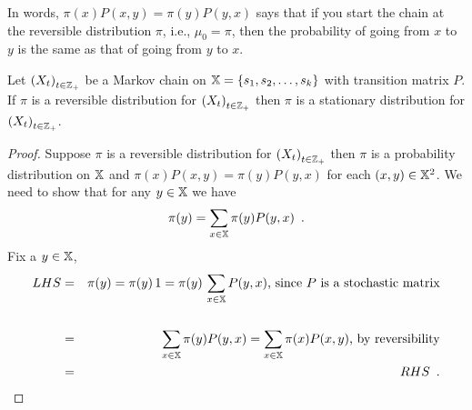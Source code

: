 {In words, $\pi(x) P(x,y) = \pi(y) P(y,x)$ says that if you start the chain at the reversible distribution $\pi$, i.e., $\mu_0 = \pi$, then the probability of going from $x$ to $y$ is the same as that of going from $y$ to $x$.

\begin{prop}\label{P:ReversibleIsStationary}
Let $\left(X_t\right)_{t \in \mathbb{Z}_+}$ be a Markov chain on $\mathbb{X} = \{s_1,s_2,\ldots,s_k\}$ with transition matrix $P$.  
If $\pi$ is a reversible distribution for $\left(X_t\right)_{t \in \mathbb{Z}_+}$ then $\pi$ is a stationary distribution for $\left(X_t\right)_{t \in \mathbb{Z}_+}$.
\begin{proof}
Suppose $\pi$ is a reversible distribution for $\left(X_t\right)_{t \in \mathbb{Z}_+}$ then $\pi$ is a probability distribution on $\mathbb{X}$ and $\pi(x) P(x,y) = \pi(y) P(y,x)$ for each $(x,y)\in \mathbb{X}^2$.  
We need to show that for any $y \in \mathbb{X}$ we have $$\pi(y)=\sum_{x\in\mathbb{X}}\pi(y) P(y,x) \enspace .$$ 
Fix a $y \in \mathbb{X}$,
\begin{eqnarray*}
LHS 
&=& \pi(y)= \pi(y) \, 1 = \pi(y) \, \sum_{x \in \mathbb{X}} P(y,x) \text{, since $P$ is a stochastic matrix} \\\\
&=& \sum_{x \in \mathbb{X}} \pi(y) P(y,x) = \sum_{x \in \mathbb{X}} \pi(x) P(x,y) \text{,  by reversibility} \\
&=& RHS \enspace .
\end{eqnarray*}
\end{proof}
\end{prop}



}
